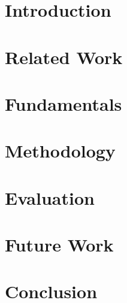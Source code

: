 \section{Introduction}
\label{sec:introduction}

\section{Related Work}
\label{sec:related_work}


\section{Fundamentals}
\label{sec:fundamentals}


\section{Methodology}
\label{sec:methodology}

\section{Evaluation}
\label{sec:evaluation}

\section{Future Work}
\label{sec:future_work}

\section{Conclusion}
\label{sec:conclusion}
